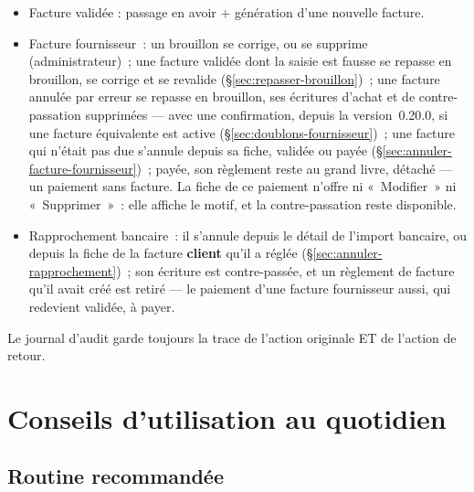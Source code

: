 \documentclass[a4paper,11pt,oneside]{article}
\begin{document}
\begin{itemize}
          (\S\ref{sec:annuler-facture-fournisseur}) ne s'annulent pas~: un administrateur doit
          d'abord rouvrir les exercices clôturés jusqu'à celui de la pièce, en commençant par
          le plus récent. De même, un règlement, un solde, un rapprochement, un paiement ou une
          facture fournisseur dont le \textbf{lettrage} est figé par une période close ne
          s'annule pas tant qu'un administrateur n'a pas fait reculer le verrou et/ou rouvert
          les exercices clôturés (\S\ref{sec:verrou-periode}).
    \item Facture validée : passage en avoir + génération d'une nouvelle facture.
    \item Facture fournisseur~: un brouillon se corrige, ou se supprime (administrateur)~; une
          facture validée dont la saisie est fausse se repasse en brouillon, se corrige et se
          revalide (\S\ref{sec:repasser-brouillon})~; une facture annulée par erreur se repasse
          en brouillon, ses écritures d'achat et de contre-passation supprimées --- avec une
          confirmation, depuis la version~0.20.0, si une facture équivalente est active
          (\S\ref{sec:doublons-fournisseur})~; une facture qui n'était pas due s'annule depuis
          sa fiche, validée ou payée (\S\ref{sec:annuler-facture-fournisseur})~; payée, son règlement reste au grand
          livre, détaché --- un paiement sans facture. La fiche de ce paiement n'offre ni «~Modifier~» ni «~Supprimer~»~: elle affiche le motif, et la contre-passation reste disponible.
    \item Rapprochement bancaire~: il s'annule depuis le détail de l'import bancaire, ou depuis
          la fiche de la facture \textbf{client} qu'il a réglée (\S\ref{sec:annuler-rapprochement})~; son
          écriture est contre-passée, et un règlement de facture qu'il avait créé est retiré ---
          le paiement d'une facture fournisseur aussi, qui redevient validée, à payer.
\end{itemize}

Le journal d'audit garde toujours la trace de l'action originale ET de l'action de retour.

\section{Conseils d'utilisation au quotidien}

\subsection{Routine recommandée}
\end{document}
